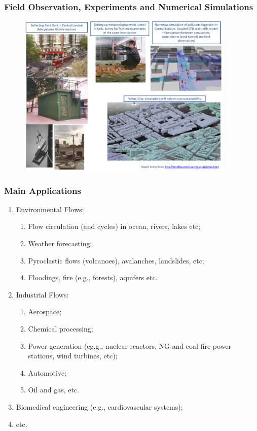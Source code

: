 \documentclass[10pt,compress]{beamer}
\begin{document}
\begin{frame}
 \frametitle{Field Observation, Experiments and Numerical Simulations} 

   \begin{figure}%
    \begin{center}
     \includegraphics[width=12.cm, height=7.8cm, clip]{./Figs/Dapple.pdf}
    \end{center}
   \end{figure}    

\end{frame}

\begin{frame}
 \frametitle{Main Applications} 
\begin{enumerate}
\item <1-> Environmental Flows:
  \begin{enumerate}
    \item <2-> Flow circulation (and cycles) in ocean, rivers, lakes etc;
    \item <3-> Weather forecasting;
    \item <4-> Pyroclastic flows (volcanoes), avalanches, landslides, etc;
    \item <5-> Floodings, fire (e.g., forests), aquifers etc.
  \end{enumerate}
\item <6-> Industrial Flows:
  \begin{enumerate}
    \item <7-> Aerospace;
    \item <8-> Chemical processing;
    \item <9-> Power generation (eg.g., nuclear reactors, NG and coal-fire power stations, wind turbines, etc);
    \item <10-> Automotive;
    \item <11-> Oil and gas, etc. 
  \end{enumerate}
\item <12-> Biomedical engineering (e.g., cardiovascular systems);
\item <13-> etc.
  
\end{enumerate}

\end{frame}
\end{document}
